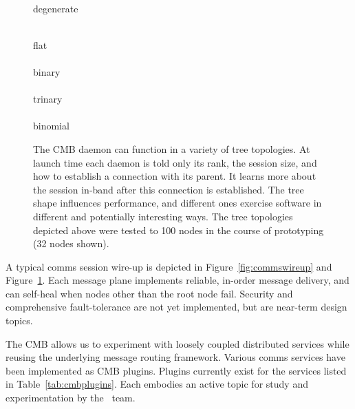 \begin{figure}
\begin{minipage}[b]{0.10\linewidth}
  \centering
  \\
  degenerate
\end{minipage}
\hspace{0.5cm}
\begin{minipage}[b]{0.80\linewidth}
  \centering
  \\ flat\\
  \vspace{0.5cm}
  \\ binary\\
  \vspace{0.5cm}
  \\ trinary\\
  \vspace{0.5cm}
  \\ binomial\\
\end{minipage}
\caption{The CMB daemon can function in a variety of tree topologies.
At launch time each daemon is told only its rank, the
session size, and how to establish a connection with its parent.
It learns more about the session in-band after this connection is established.
The tree shape influences performance, and different ones
exercise software in different and potentially interesting ways.
The tree topologies depicted above were tested to 100 nodes in
the course of prototyping (32 nodes shown).}
\label{fig:treetop}
\end{figure}

A typical comms session wire-up is depicted in Figure~\ref{fig:commswireup}
and Figure~\ref{fig:treetop}.
Each message plane implements reliable, in-order message delivery, and
can self-heal when nodes other than the root node fail.
Security and comprehensive fault-tolerance are not yet implemented,
but are near-term design topics.

The CMB allows us to experiment with loosely coupled distributed services
while reusing the underlying message routing framework.  Various comms
services have been implemented as CMB plugins.  Plugins currently exist for
the services listed in Table~\ref{tab:cmbplugins}.
Each embodies an active topic for study and experimentation by the \flux\ team.

